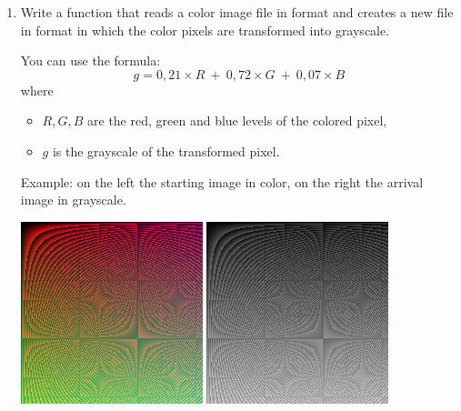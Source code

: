 \documentclass[11pt,class=report,crop=false]{standalone}
\begin{document}
\begin{activite}
\begin{enumerate}
\item Write a  function that reads a color image file in  format and creates a new file in  format in which the color pixels are transformed into grayscale. 

You can use the formula: 
$$g = 0,21 \times R \  + \  0,72 \times G \  + \  0,07 \times B$$
where
\begin{itemize}
  \item $R,G,B$ are the red, green and blue levels of the colored pixel,
  \item $g$ is the grayscale of the transformed pixel.
\end{itemize}

Example: on the left the starting image in color, on the right the arrival image in grayscale.
\begin{center}
\includegraphics[scale=\myscale,scale=0.5]{screen-image_coul}\qquad\qquad
\includegraphics[scale=\myscale,scale=0.5]{screen-image_coul_gris}
\end{center} 


\end{enumerate}   
     
\end{activite}


\end{document}

